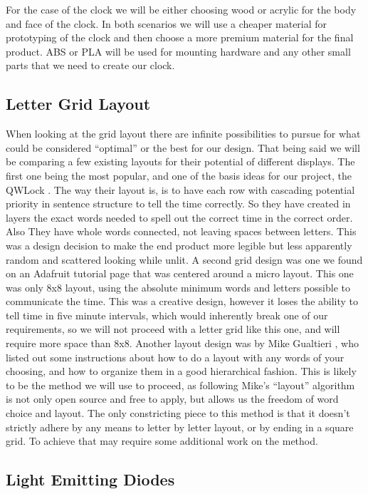 \documentclass[onecolumn, draftclsnofoot,10pt, compsoc]{IEEEtran}
\begin{document}
For the case of the clock we will be either choosing wood or acrylic for the body and face of the clock.
In both scenarios we will use a cheaper material for prototyping of the clock and then choose a more premium material for the final product.
ABS or PLA will be used for mounting hardware and any other small parts that we need to create our clock.

\subsection{Letter Grid Layout}
When looking at the grid layout there are infinite possibilities to pursue for what could be considered “optimal” or the best for our design.
That being said we will be comparing a few existing layouts for their potential of different displays.
The first one being the most popular, and one of the basis ideas for our project, the QWLock \cite{QWLock}.
The way their layout is, is to have each row with cascading potential priority in sentence structure to tell the time correctly.
So they have created in layers the exact words needed to spell out the correct time in the correct order.
Also They have whole words connected, not leaving spaces between letters.
This was a design decision to make the end product more legible but less apparently random and scattered looking while unlit.
A second grid design was one we found on an Adafruit tutorial page \cite{smallgrid} that was centered around a micro layout.
This one was only 8x8 layout, using the absolute minimum words and letters possible to communicate the time.
This was a creative design, however it loses the ability to tell time in five minute intervals, which would inherently break one of our requirements, so we will not proceed with a letter grid like this one, and will require more space than 8x8.
Another layout design was by Mike Gualtieri \cite{mikegrid}, who listed out some instructions about how to do a layout with any words of your choosing, and how to organize them in a good hierarchical fashion.
This is likely to be the method we will use to proceed, as following Mike’s “layout” algorithm is not only open source and free to apply, but allows us the freedom of word choice and layout.
The only constricting piece to this method is that it doesn’t strictly adhere by any means to letter by letter layout, or by ending in a square grid.
To achieve that may require some additional work on the method.

\subsection{Light Emitting Diodes}
\end{document}
